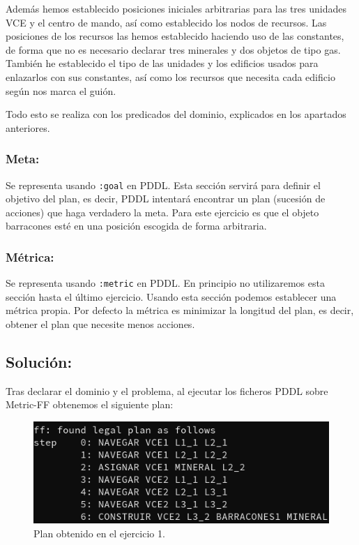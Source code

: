 \documentclass[11pt, spanish]{article}
\begin{document}
Además hemos establecido posiciones iniciales arbitrarias para las tres unidades VCE y el centro de mando, así como establecido los nodos de recursos. Las posiciones de los recursos las hemos establecido haciendo uso de las constantes, de forma que no es necesario declarar tres minerales y dos objetos de tipo gas. También he establecido el tipo de las unidades y los edificios usados para enlazarlos con sus constantes, así como los recursos que necesita cada edificio según nos marca el guión.

Todo esto se realiza con los predicados del dominio, explicados en los apartados anteriores.

\subsubsection{Meta:}

Se representa usando \texttt{:goal} en PDDL. Esta sección servirá para definir el objetivo del plan, es decir, PDDL intentará encontrar un plan (sucesión de acciones) que haga verdadero la meta. Para este ejercicio es que el objeto barracones esté en una posición escogida de forma arbitraria.

\subsubsection{Métrica:}

Se representa usando \texttt{:metric} en PDDL. En principio no utilizaremos esta sección hasta el último ejercicio. Usando esta sección podemos establecer una métrica propia. Por defecto la métrica es minimizar la longitud del plan, es decir, obtener el plan que necesite menos acciones.


\subsection{Solución:}

Tras declarar el dominio y el problema, al ejecutar los ficheros PDDL sobre Metric-FF obtenemos el siguiente plan:

\begin{figure}[H]
	\centering
	\includegraphics[scale=0.4]{plan1.png}
	\caption{Plan obtenido en el ejercicio 1.}
	\label{plan1}
\end{figure}
\end{document}
